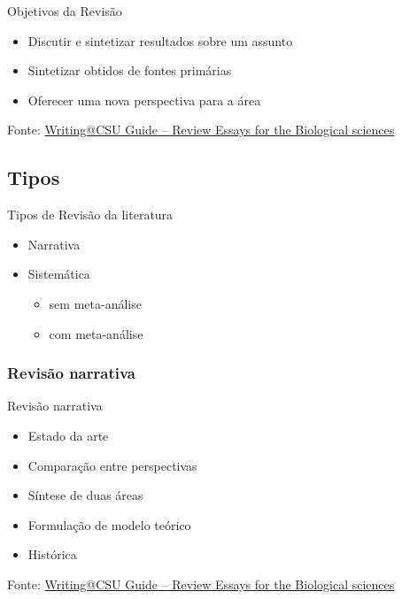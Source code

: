 \documentclass{beamer}
\begin{document}
\begin{frame}{Objetivos da Revisão}
  \begin{itemize}
    \footnotesize
  \item Discutir e sintetizar resultados sobre um assunto
    \bigskip
  \item Sintetizar obtidos de fontes primárias
    \bigskip
  \item Oferecer uma nova perspectiva para a área
  \end{itemize}

  \vfill
  \scriptsize
  \hfill Fonte: \href{https://writing.colostate.edu/guides/guide.cfm?guideid=79}
  {\tiny Writing@CSU Guide -- Review Essays for the Biological sciences}
\end{frame}

\subsection{Tipos}

\begin{frame}{Tipos de Revisão da literatura}
  \begin{itemize}
    \footnotesize
  \item Narrativa
    \bigskip
  \item Sistemática
    \begin{itemize}
      \scriptsize
      \medskip
    \item sem meta-análise
      \smallskip
    \item com meta-análise
    \end{itemize}
  \end{itemize}
\end{frame}

\subsubsection[Narrativa]{Revisão narrativa}

\begin{frame}{Revisão narrativa}
  \begin{itemize}
    \scriptsize
  \item Estado da arte
    \bigskip
  \item Comparação entre perspectivas
    \bigskip
  \item Síntese de duas áreas
    \bigskip
  \item Formulação de modelo teórico
    \bigskip
  \item Histórica
  \end{itemize}

  \vfill
  \scriptsize
  \hfill Fonte: \href{https://writing.colostate.edu/guides/guide.cfm?guideid=79}
  {\tiny Writing@CSU Guide -- Review Essays for the Biological sciences}
\end{frame}
\end{document}
